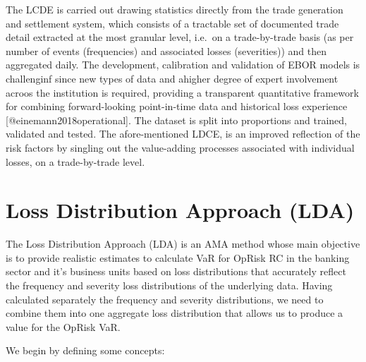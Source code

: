 \documentclass[]{article}
\begin{document}
The LCDE is carried out drawing statistics directly from the trade
generation and settlement system, which consists of a tractable set of
documented trade detail extracted at the most granular level, i.e.~on a
trade-by-trade basis (as per number of events (frequencies) and
associated losses (severities)) and then aggregated daily. The
development, calibration and validation of EBOR models is challenginf
since new types of data and ahigher degree of expert involvement acroos
the institution is required, providing a transparent quantitative
framework for combining forward-looking point-in-time data and
historical loss experience {[}@einemann2018operational{]}. The dataset
is split into proportions and trained, validated and tested. The
afore-mentioned LDCE, is an improved reflection of the risk factors by
singling out the value-adding processes associated with individual
losses, on a trade-by-trade level.

\section{Loss Distribution Approach (LDA)}
\label{sec:Loss Distribution Approach (LDA)}

The Loss Distribution Approach (LDA) is an AMA method whose main
objective is to provide realistic estimates to calculate VaR for OpRisk
RC in the banking sector and it's business units based on loss
distributions that accurately reflect the frequency and severity loss
distributions of the underlying data. Having calculated separately the
frequency and severity distributions, we need to combine them into one
aggregate loss distribution that allows us to produce a value for the
OpRisk VaR. \medskip

We begin by defining some concepts:
\end{document}
